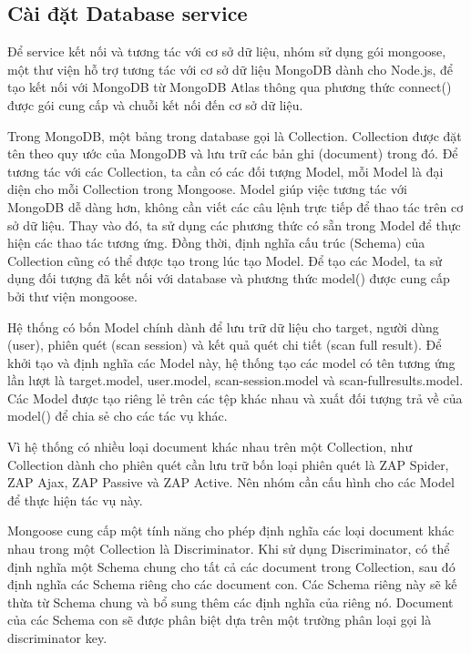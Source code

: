 \subsection{Cài đặt Database service}

\tab Để service kết nối và tương tác với cơ sở dữ liệu, nhóm sử dụng gói mongoose, một thư viện hỗ trợ tương tác với cơ sở dữ liệu MongoDB dành cho Node.js, để tạo kết nối với MongoDB từ MongoDB Atlas thông qua phương thức connect() được gói cung cấp và chuỗi kết nối đến cơ sở dữ liệu. 
\par

Trong MongoDB, một bảng trong database gọi là Collection. Collection được đặt tên theo quy ước của MongoDB và lưu trữ các bản ghi (document) trong đó. Để tương tác với các Collection, ta cần có các đối tượng Model, mỗi Model là đại diện cho mỗi Collection trong Mongoose. Model giúp việc tương tác với MongoDB dễ dàng hơn, không cần viết các câu lệnh trực tiếp để thao tác trên cơ sở dữ liệu. Thay vào đó, ta sử dụng các phương thức có sẵn trong Model để thực hiện các thao tác tương ứng. Đồng thời, định nghĩa cấu trúc (Schema) của Collection cũng có thể được tạo trong lúc tạo Model. Để tạo các Model, ta sử dụng đối tượng đã kết nối với database và phương thức model() được cung cấp bởi thư viện mongoose.
\par

Hệ thống có bốn Model chính dành để lưu trữ dữ liệu cho target, người dùng (user), phiên quét (scan session) và kết quả quét chi tiết (scan full result). Để khởi tạo và định nghĩa các Model này, hệ thống tạo các model có tên tương ứng lần lượt là target.model, user.model, scan-session.model và scan-fullresults.model. Các Model được tạo riêng lẻ trên các tệp khác nhau và xuất đối tượng trả về của model() để chia sẻ cho các tác vụ khác.
\par

Vì hệ thống có nhiều loại document khác nhau trên một Collection, như Collection dành cho phiên quét cần lưu trữ bốn loại phiên quét là ZAP Spider, ZAP Ajax, ZAP Passive và ZAP Active. Nên nhóm cần cấu hình cho các Model để thực hiện tác vụ này. 
\par

Mongoose cung cấp một tính năng cho phép định nghĩa các loại document khác nhau trong một Collection là Discriminator. Khi sử dụng Discriminator, có thể định nghĩa một Schema chung cho tất cả các document trong Collection, sau đó định nghĩa các Schema riêng cho các document con. Các Schema riêng này sẽ kế thừa từ Schema chung và bổ sung thêm các định nghĩa của riêng nó. Document của các Schema con sẽ được phân biệt dựa trên một trường phân loại gọi là discriminator key. 
\par

